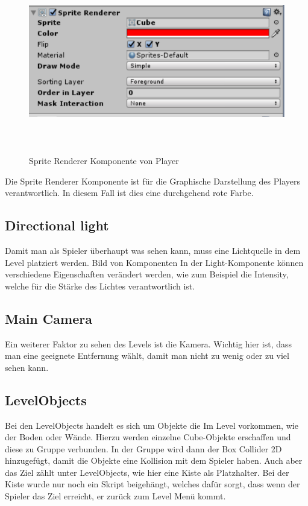 \begin{figure}[H]
	\includegraphics[height=8cm]{images/SpriteRenderer.png}
	\caption{Sprite Renderer Komponente von Player}
\end{figure}
Die Sprite Renderer Komponente ist für die Graphische Darstellung des Players verantwortlich. In diesem Fall ist dies eine durchgehend rote Farbe.

\subsection{Directional light}
Damit man als Spieler überhaupt was sehen kann, muss eine Lichtquelle in dem Level platziert werden.
Bild von Komponenten
In der Light-Komponente können verschiedene Eigenschaften verändert werden, wie zum Beispiel die Intensity, welche für die Stärke des Lichtes verantwortlich ist.
\subsection{Main Camera}
Ein weiterer Faktor zu sehen des Levels ist die Kamera. Wichtig hier ist, dass man eine geeignete Entfernung wählt, damit man nicht zu wenig oder zu viel sehen kann.
\subsection{LevelObjects}
Bei den LevelObjects handelt es sich um Objekte die Im Level vorkommen, wie der Boden oder Wände. Hierzu werden einzelne Cube-Objekte erschaffen und diese zu Gruppe verbunden. In der Gruppe wird dann der Box Collider 2D hinzugefügt, damit die Objekte eine Kollision mit dem Spieler haben. Auch aber das Ziel zählt unter LevelObjects, wie hier eine Kiste als Platzhalter. Bei der Kiste wurde nur noch ein Skript beigehängt, welches dafür sorgt, dass wenn der Spieler das Ziel erreicht, er zurück zum Level Menü kommt.
